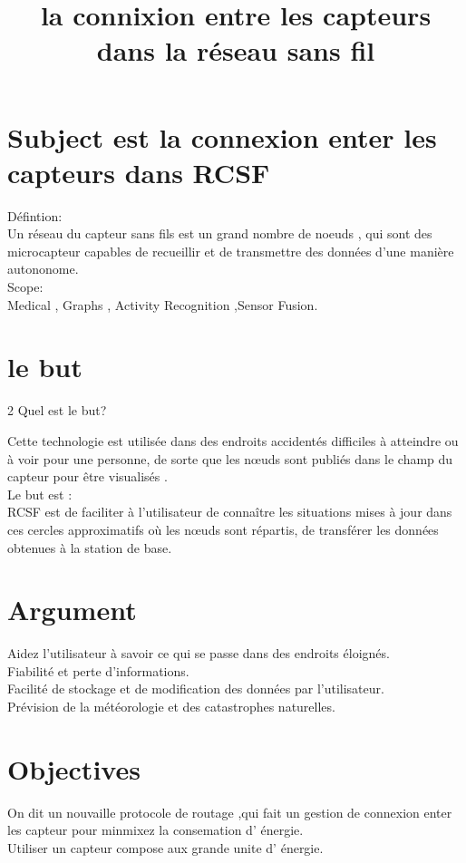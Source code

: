 \documentclass[12pt]{article}
\begin{document}
 \title{la connixion entre les capteurs dans la réseau sans fil }
 \maketitle
\section{Subject est la connexion enter les capteurs dans RCSF }
Défintion:\\
Un réseau du capteur sans fils est un grand nombre de noeuds , qui sont des microcapteur capables de recueillir et de transmettre des données d'une manière autononome.\\ 
Scope:\\
Medical , Graphs , Activity Recognition ,Sensor Fusion. \\

\section{le but}
2 Quel est le but? 

Cette technologie est utilisée dans des endroits accidentés difficiles à atteindre ou à voir pour une personne, de sorte que les nœuds sont publiés dans le champ du capteur pour être visualisés .\\
Le but est :\\
 RCSF est de faciliter à l'utilisateur de connaître les situations mises à jour dans ces cercles approximatifs où les nœuds sont répartis, de transférer les données obtenues à la station de base. \\

\section{Argument}
Aidez l'utilisateur à savoir ce qui se passe dans des endroits éloignés.\\
Fiabilité et perte d'informations.\\
Facilité de stockage et de modification des données par l'utilisateur.\\
Prévision de la météorologie et des catastrophes naturelles.\\



\section{ Objectives }
On dit un nouvaille protocole de routage ,qui fait un gestion de connexion enter les capteur pour minmixez la consemation d' énergie.\\
Utiliser un capteur compose aux grande unite d' énergie.\\
 
\end{document}
